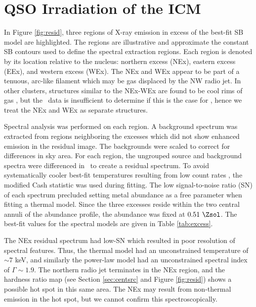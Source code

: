 \documentclass[useAMS,usenatbib]{mn2e}
\begin{document}
\section{QSO Irradiation of the ICM}
\label{sec:excess}

In Figure \ref{fig:resid}, three regions of X-ray emission in excess
of the best-fit SB model are highlighted. The regions are illustrative
and approximate the constant SB contours used to define the spectral
extraction regions. Each region is denoted by its location relative to
the nucleus: northern excess (NEx), eastern excess (EEx), and western
excess (WEx). The NEx and WEx appear to be part of a tenuous, arc-like
filament which may be gas displaced by the NW radio jet. In other
clusters, structures similar to the NEx-WEx are found to be cool rims
of gas \citep[\eg][]{2009ApJ...697L..95B}, but the \chandra\ data is
insufficient to determine if this is the case for \irs, hence we treat
the NEx and WEx as separate structures.

Spectral analysis was performed on each region. A background spectrum
was extracted from regions neighboring the excesses which did not show
enhanced emission in the residual image. The backgrounds were scaled
to correct for differences in sky area. For each region, the ungrouped
source and background spectra were differenced in \xspec\ to create a
residual spectrum. To avoid systematically cooler best-fit
temperatures resulting from low count rates
\citep{1989ApJ...342.1207N}, the modified Cash statistic
\citep{1979ApJ...228..939C} was used during fitting. The low
signal-to-noise ratio (SN) of each spectrum precluded setting metal
abundance as a free parameter when fitting a thermal model. Since the
three excesses reside within the two central annuli of the abundance
profile, the abundance was fixed at $0.51 ~\Zsol$. The best-fit values
for the spectral models are given in Table \ref{tab:excess}.

The NEx residual spectrum had low-SN which resulted in poor resolution
of spectral features. Thus, the thermal model had an unconstrained
temperature of $\sim 7$ keV, and similarly the power-law model had an
unconstrained spectral index of $\Gamma \sim 1.9$. The northern radio
jet terminates in the NEx region, and the hardness ratio map (see
Section \ref{sec:centsrc} and Figure \ref{fig:resid}) shows a possible
hot spot in this same area. The NEx may result from non-thermal
emission in the hot spot, but we cannot confirm this
spectroscopically.
\end{document}

